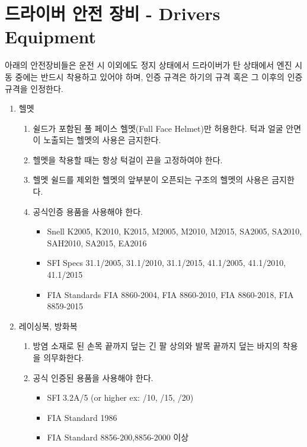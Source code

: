 \documentclass[final,a4paper,10pt]{report}
\begin{document}
\section{드라이버 안전 장비 - Drivers Equipment} \label{section:드라이버 안전 장비}
아래의 안전장비들은 운전 시 이외에도 정지 상태에서 드라이버가 탄 상태에서 엔진 시동 중에는 반드시 착용하고 있어야 하며, 인증 규격은 하기의 규격 혹은 그 이후의 인증 규격을 인정한다.
\begin{enumerate}
  \item 헬멧
    \begin{enumerate}
      \item 쉴드가 포함된 풀 페이스 헬멧(Full Face Helmet)만 허용한다. 턱과 얼굴 안면이 노출되는 헬멧의 사용은 금지한다.
      \item 헬멧을 착용할 때는 항상 턱걸이 끈을 고정하여야 한다.
      \item 헬멧 쉴드를 제외한 헬멧의 앞부분이 오픈되는 구조의 헬멧의 사용은 금지한다.
      
      \item 공식인증 용품을 사용해야 한다.
        \begin{itemize}
          \item Snell K2005, K2010, K2015, M2005, M2010, M2015, SA2005, SA2010, SAH2010, SA2015, EA2016
          \item SFI Specs 31.1/2005, 31.1/2010, 31.1/2015, 41.1/2005, 41.1/2010, 41.1/2015
          \item FIA Standards FIA 8860-2004, FIA 8860-2010, FIA 8860-2018, FIA 8859-2015
        \end{itemize}
      
    \end{enumerate}
    
  \item 레이싱복, 방화복
    \begin{enumerate}
      \item 방염 소재로 된 손목 끝까지 덮는 긴 팔 상의와 발목 끝까지 덮는 바지의 착용을 의무화한다.
      
      \item 공식 인증된 용품을 사용해야 한다.
        \begin{itemize}
          \item SFI 3.2A/5 (or higher ex: /10, /15, /20)
          \item FIA Standard 1986
          \item FIA Standard 8856-200,8856-2000 이상
        \end{itemize}
    \end{enumerate}
    

\end{enumerate}
\end{document}
